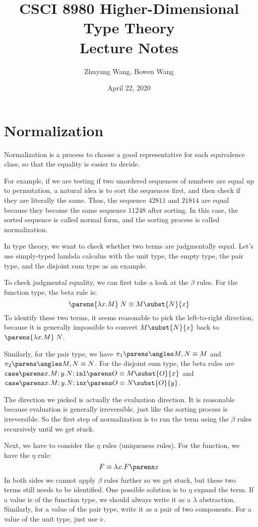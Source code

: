 \documentclass[11pt]{article}
\title{CSCI 8980 Higher-Dimensional Type Theory\\ Lecture Notes}
\author{Zhuyang Wang, Bowen Wang}
\date{April 22, 2020}
\begin{document}
\maketitle

\section{Normalization}
Normalization is a process to choose a good representative for each equivalence class, so that the equality is easier to decide.

For example, if we are testing if two unordered sequences of numbers are equal up to permutation, a natural idea is to sort the sequences first, and then check if they are literally the same. Thus, the sequence $42811$ and $21814$ are equal because they become the same sequence $11248$ after sorting. In this case, the sorted sequence is called normal form, and the sorting process is called normalization.

In type theory, we want to check whether two terms are judgmentally equal. Let's use simply-typed lambda calculus with the unit type, the empty type, the pair type, and the disjoint sum type as an example.

To check judgmental equality, we can first take a look at the $\beta$ rules. For the function type, the beta rule is:
\[
  \app{\parens{\lam{x}{M}}}{N} \equiv M\subst{N}{x}
\]
To identify these two terms, it seems reasonable to pick the left-to-right direction, because it is generally impossible to convert $M\subst{N}{x}$ back to $\app{\parens{\lam{x}{M}}}{N}$.

Similarly, for the pair type, we have $\pairfst{\pair{M}{N}} \equiv M$ and $\pairsnd{\pair{M}{N}} \equiv N$. For the disjoint sum type, the beta rules are $\sumcase{x}{M}{y}{N}{\suminl{O}} \equiv M\subst{O}{x}$ and $\sumcase{x}{M}{y}{N}{\suminr{O}} \equiv N\subst{O}{y}$.

The direction we picked is actually the evaluation direction. It is reasonable because evaluation is generally irreversible, just like the sorting process is irreversible. So the first step of normalization is to run the term using the $\beta$ rules recursively until we get stuck.

Next, we have to consider the $\eta$ rules (uniqueness rules). For the function, we have the $\eta$ rule:
\[
  F \equiv \lam{x}{\app*{F}{x}}
\]
In both sides we cannot apply $\beta$ rules further so we get stuck, but these two terms still needs to be identified. One possible solution is to $\eta$ expand the term. If a value is of the function type, we should always write it as a $\lambda$ abstraction. Similarly, for a value of the pair type, write it as a pair of two components. For a value of the unit type, just use $\diamond$.
\end{document}
